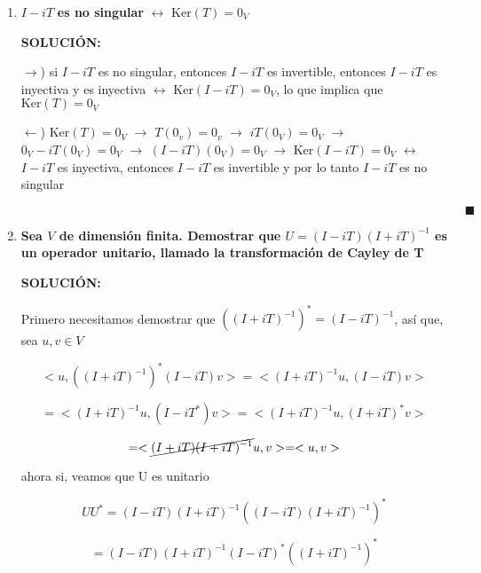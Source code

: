 \documentclass[12pt,a4paper]{article}
\begin{document}
\begin{enumerate}
\begin{enumerate}
        \item $I-iT$ \textbf{es no singular}   $\leftrightarrow$  $\text{Ker}(T)={0_V}$
        
        \textbf{SOLUCIÓN:}
        
        $\rightarrow$) si $I-iT$ es no singular, entonces $I-iT$ es invertible, entonces $I-iT$ es inyectiva y es inyectiva $\leftrightarrow$ $\text{Ker}(I-iT)=0_V$, lo que implica que $\text{Ker}(T)=0_V$
        
        $\leftarrow$) $\text{Ker}(T)=0_V$ $\rightarrow$  $T(0_v)=0_v$ $\rightarrow$ $iT(0_V)=0_V$ $\rightarrow$ $0_V-iT(0_V)=0_V$ $\rightarrow$ $(I-iT)(0_V)=0_V$ $\rightarrow$ $\text{Ker}(I-iT)=0_V$ $\leftrightarrow$ $I-iT$ es inyectiva, entonces $I-iT$ es invertible y por lo tanto $I-iT$ es no singular
        
        $\hspace{15cm} \blacksquare$
        
        \item \textbf{Sea $V$ de dimensión finita. Demostrar que $U=(I-iT)(I+iT)^{-1}$ es un operador unitario, llamado la transformación de Cayley de T}
        
        \textbf{SOLUCIÓN:} 
        
        Primero necesitamos demostrar que $((I+iT)^{-1})^{*}= (I-iT)^{-1}$, así que, sea $u,v \in V$
        
        \begin{equation*}
            <u,((I+iT)^{-1})^{*}(I-iT)v>=<(I+iT)^{-1}u,(I-iT)v>
        \end{equation*}
        
        \begin{equation*}
            =<(I+iT)^{-1}u,(I-iT^{*})v>=<(I+iT)^{-1}u,(I+iT)^{*}v>
        \end{equation*}
        
        \begin{equation*}
            =<\cancel{(I+iT)(I+iT)^{-1}}u,v>=<u,v>
        \end{equation*}
        
        ahora si, veamos que U es unitario
        
        \begin{equation*}
            UU^{*}=(I-iT)(I+iT)^{-1}((I-iT)(I+iT)^{-1})^{*}
        \end{equation*}
        
        \begin{equation*}
            =(I-iT)(I+iT)^{-1}(I-iT)^{*}((I+iT)^{-1})^{*}
        \end{equation*}
        

\end{enumerate}
\end{enumerate}
\end{document}
